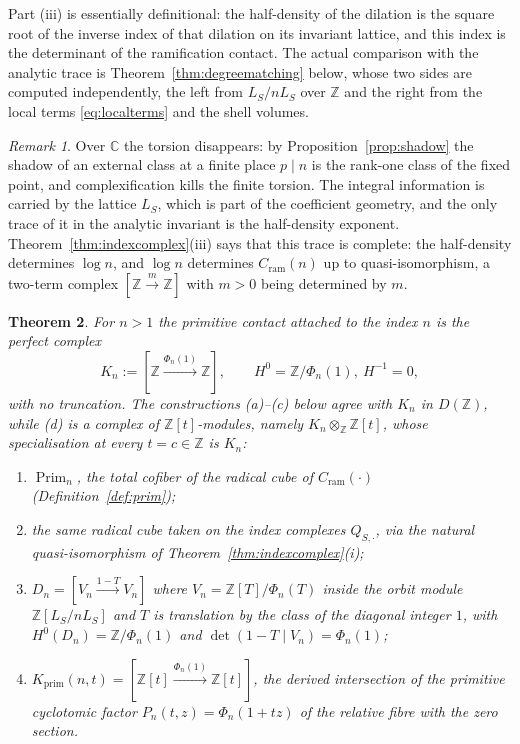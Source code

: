 \documentclass[11pt]{amsart}
\newtheorem{theorem}{Theorem}[section]
\theoremstyle{definition}
\theoremstyle{remark}
\newtheorem{remark}[theorem]{Remark}
\newcommand{\C}{\mathbb C}
\newcommand{\Z}{\mathbb Z}
\newcommand{\Prim}{\operatorname{Prim}}
\begin{document}
Part (iii) is essentially definitional: the half-density of the dilation is
the square root of the inverse index of that dilation on its invariant
lattice, and this index is the determinant of the ramification contact.  The
actual comparison with the analytic trace is Theorem~\ref{thm:degreematching}
below, whose two sides are computed independently, the left from $L_S/nL_S$
over $\Z$ and the right from the local terms \eqref{eq:localterms} and the
shell volumes.

\begin{remark}\label{rem:complexshadow}
Over $\C$ the torsion disappears: by Proposition~\ref{prop:shadow} the shadow
of an external class at a finite place $p\mid n$ is the rank-one class of the
fixed point, and complexification kills the finite torsion. The integral
information is carried by the lattice $L_S$, which is part of the coefficient
geometry, and the only trace of it in the analytic invariant is the
half-density exponent. Theorem~\ref{thm:indexcomplex}(iii) says that this trace
is complete: the half-density determines $\log n$, and $\log n$ determines
$C_{\mathrm{ram}}(n)$ up to quasi-isomorphism, a two-term complex
$[\Z\xrightarrow{m}\Z]$ with $m>0$ being determined by $m$.
\end{remark}

\begin{theorem}\label{thm:fourmodels}
For $n>1$ the primitive contact attached to the index $n$ is the perfect
complex
\begin{equation}\label{eq:Kn}
  K_n:=[\Z\xrightarrow{\Phi_n(1)}\Z],\qquad H^0=\Z/\Phi_n(1),\ H^{-1}=0,
\end{equation}
with no truncation. The constructions (a)--(c) below agree with $K_n$ in
$D(\Z)$, while (d) is a complex of $\Z[t]$-modules, namely
$K_n\otimes_\Z\Z[t]$, whose specialisation at every $t=c\in\Z$ is $K_n$:
\begin{enumerate}
\item[(a)] $\Prim_n$, the total cofiber of the radical cube of
$C_{\mathrm{ram}}(\cdot)$ (Definition~\ref{def:prim});
\item[(b)] the same radical cube taken on the index complexes
$Q_{S,\cdot}$, via the natural quasi-isomorphism of
Theorem~\ref{thm:indexcomplex}(i);
\item[(c)] $D_n=[V_n\xrightarrow{1-T}V_n]$ where $V_n=\Z[T]/\Phi_n(T)$ inside
the orbit module $\Z[L_S/nL_S]$ and $T$ is translation by the class of the
diagonal integer $1$, with $H^0(D_n)=\Z/\Phi_n(1)$ and
$\det(1-T\mid V_n)=\Phi_n(1)$;
\item[(d)] $K_{\mathrm{prim}}(n,t)=[\Z[t]\xrightarrow{\Phi_n(1)}\Z[t]]$, the
derived intersection of the primitive cyclotomic factor
$P_n(t,z)=\Phi_n(1+tz)$ of the relative fibre with the zero section.
\end{enumerate}
\end{theorem}
\end{document}
